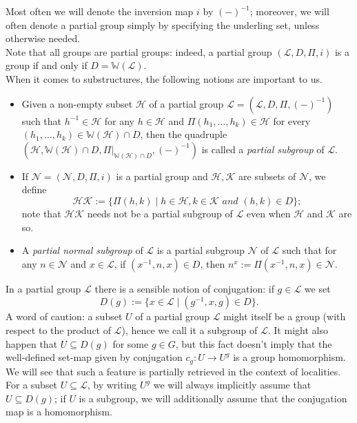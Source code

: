 \documentclass{amsart}
\numberwithin{equation}{section}
\theoremstyle{definition}
\theoremstyle{subresult}
\theoremstyle{caseresult}
\newcommand{\W}{\mathbb{W}}
\newcommand{\N}{\mathcal{N}}
\renewcommand{\L}{\mathcal{L}}
\renewcommand{\H}{\mathcal{H}}
\newcommand{\K}{\mathcal{K}}
\newcommand{\inv}{^{-1}}
\newcommand{\fto}{\longrightarrow}
\newcommand{\<}{\langle}
\renewcommand{\>}{\rangle}
\begin{document}
Most often we will denote the inversion map $i$ by $(-)\inv$; moreover, we will often denote a partial group simply by specifying the underling set, unless otherwise needed.\\
Note that all groups are partial groups: indeed, a partial group $(\L,D,\Pi,i)$ is a group if and only if $D=\W(\L)$.\\

When it comes to substructures, the following notions are important to us.
\begin{itemize}
\item Given a non-empty subset $\H$ of a partial group $\L=(\L,D,\Pi,(-)\inv)$ such that $h\inv \in \H$ for any $h \in \H$ and $\Pi(h_1,\dots,h_k) \in \H$ for every $(h_1,\dots,h_k) \in \W(\H)\cap D$, then the quadruple $(\H, \W(\H) \cap D, \Pi|_{\W(\H) \cap D},(-)\inv)$ is called a \emph{partial subgroup} of $\L$.\\
\item If $\N=(\N,D,\Pi,i)$ is a partial group and $\H, \K$ are subsets of $\N$, we define
\[
\H \K := \{ \Pi(h,k) \mid h \in \H, k \in \K \textit{ and } (h,k) \in D \};
\]
note that $\H \K$ needs not be a partial subgroup of $\L$ even when $\H$ and $\K$ are so.
\item A \emph{partial normal subgroup} of $\L$ is a partial subgroup $\N$ of $\L$ such that for any $n \in \N$ and $x \in \L$, if $(x\inv,n,x) \in D$, then $n^x := \Pi(x\inv, n,x) \in \N$.
\end{itemize}

In a partial group $\L$ there is a sensible notion of conjugation: if $g \in \L$ we set
\[
D(g) := \{x \in \L \mid (g\inv, x,g) \in D \}.
\]
A word of caution: a subset $U$ of a partial group $\L$ might itself be a group (with respect to the product of $\L$), hence we call it a subgroup of $\L$. It might also happen that $U \subseteq D(g)$ for some $g \in G$, but this fact doesn't imply that the well-defined set-map given by conjugation $c_g: U \fto U^g$ is a group homomorphism. We will see that such a feature is partially retrieved in the context of localities. \\
For a subset $U \subseteq \L$, by writing $U^g$ we will always implicitly assume that $U \subseteq D(g)$; if $U$ is a subgroup, we will additionally assume that the conjugation map is a homomorphism.\\
\end{document}
